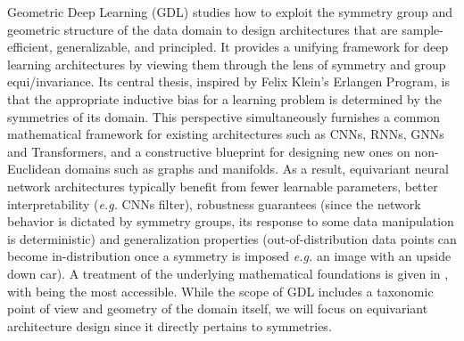 \documentclass[mathematics,review,submit,moreauthors]{Definitions/mdpi}
\begin{document}

Geometric Deep Learning (GDL) \citep{bronstein2017ispm,bronstein2021} studies how to exploit the symmetry group and geometric structure of the data domain to design architectures that are sample-efficient, generalizable, and principled.
It provides a unifying framework for deep learning architectures by viewing them through the lens of symmetry and group equi\slash invariance.
Its central thesis, inspired by Felix Klein's Erlangen Program, is that the appropriate inductive bias for a learning problem is determined by the symmetries of its domain.
This perspective simultaneously furnishes a common mathematical framework for existing architectures such as CNNs, RNNs, GNNs and Transformers, and a constructive blueprint for designing new ones on non-Euclidean domains such as graphs and manifolds.
As a result, equivariant neural network architectures typically benefit from fewer learnable parameters, better interpretability (\textit{e.g.} CNNs filter), robustness guarantees (since the network behavior is dictated by symmetry groups, its response to some data manipulation is deterministic) and generalization properties (out-of-distribution data points can become in-distribution once a symmetry is imposed \textit{e.g.} an image with an upside down car).
A treatment of the underlying mathematical foundations is given in \citep{borde2025,gerken2021,carlsson}, with \citet{borde2025} being the most accessible.
While the scope of GDL includes a taxonomic point of view and geometry of the domain itself, we will focus on equivariant architecture design since it directly pertains to symmetries.
\end{document}

